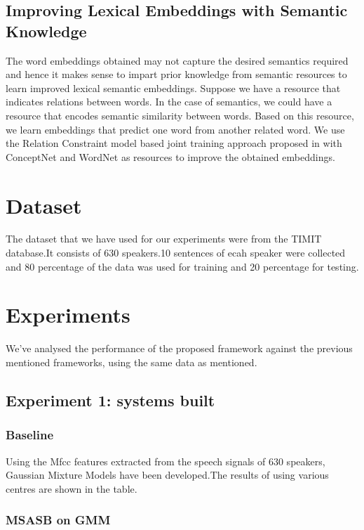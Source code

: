 \documentclass{acm_proc_article-sp}
\begin{document}
\subsection{Improving Lexical Embeddings with Semantic Knowledge}

The word embeddings obtained may not capture the desired semantics required and hence it makes sense to impart prior knowledge from semantic resources to learn improved lexical semantic embeddings. Suppose we have a resource that indicates relations between words. In the case of semantics, we could have a resource that encodes semantic similarity between words. Based on this resource, we learn embeddings that predict one word from another related word. We use the Relation Constraint model based joint training approach proposed in \cite{yu2014improving} with ConceptNet and WordNet as resources to improve the obtained embeddings.


\section{Dataset}

The dataset that we have used for our experiments were from the TIMIT database.It consists of 630 speakers.10 sentences of ecah speaker were collected and 80 percentage of the data was used for training and 20 percentage for testing. 


\section{Experiments}

We've analysed the performance of the proposed framework against the previous mentioned frameworks, using the same data as mentioned.

\subsection{Experiment 1: systems built}

\subsubsection{Baseline}
Using the Mfcc features extracted from the speech signals of 630 speakers, Gaussian Mixture Models have been developed.The results of using various centres are shown in the table.

\subsubsection{MSASB on GMM}
\end{document}
